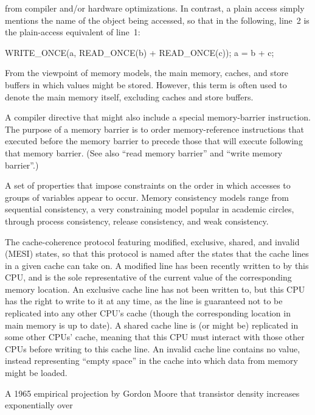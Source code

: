 \begin{description}
	from compiler and/or hardware optimizations.
	In contrast, a plain access simply mentions the name of
	the object being accessed, so that in the following, line~2
	is the plain-access equivalent of line~1:
	\begin{VerbatimN}
	WRITE_ONCE(a, READ_ONCE(b) + READ_ONCE(c));
	a = b + c;
	\end{VerbatimN}
\item[\IXG{Memory}:]
	From the viewpoint of memory models, the main memory,
	caches, and store buffers in which values might be stored.
	However, this term is often used to denote the main memory
	itself, excluding caches and store buffers.
\item[\IXG{Memory Barrier}:]
	A compiler directive that might also include a special
	memory-barrier instruction.
	The purpose of a memory barrier is to order memory-reference
	instructions that executed before the memory barrier to precede
	those that will execute following that memory barrier.
	(See also ``read memory barrier'' and ``write memory barrier''.)
\item[\IXGh{Memory}{Consistency}:]
	A set of properties that impose constraints on the order in
	which accesses to groups of variables appear to occur.
	Memory consistency models range from sequential consistency,
	a very constraining model popular in academic circles, through
	process consistency, release consistency, and weak consistency.
\item[\IXGaltr{MESI Protocol}{MESI protocol}:]
	The
	cache-coherence protocol featuring
	modified, exclusive, shared, and invalid (MESI) states,
	so that this protocol is named after the states that the
	cache lines in a given cache can take on.
	A modified line has been recently written to by this CPU,
	and is the sole representative of the current value of
	the corresponding memory location.
	An exclusive cache line has not been written to, but this
	CPU has the right to write to it at any time, as the line
	is guaranteed not to be replicated into any other CPU's cache
	(though the corresponding location in main memory is up to date).
	A shared cache line is (or might be) replicated in some other
	CPUs' cache, meaning that this CPU must interact with those other
	CPUs before writing to this cache line.
	An invalid cache line contains no value, instead representing
	``empty space'' in the cache into which data from memory might
	be loaded.
\item[\IXGaltr{Moore's Law}{Moore's Law}:]
	A 1965 empirical projection by Gordon Moore that
	transistor density increases exponentially over

\end{description}
